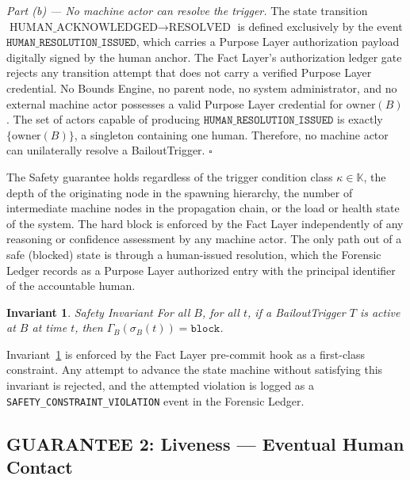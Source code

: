 \documentclass[12pt]{article}
\newtheorem{invariant}{Invariant}
\begin{document}
\medskip

\noindent\textit{Part (b) — No machine actor can resolve the trigger.} The state transition $\text{HUMAN\_ACKNOWLEDGED} \rightarrow \text{RESOLVED}$ is defined exclusively by the event $\texttt{HUMAN\_RESOLUTION\_ISSUED}$, which carries a Purpose Layer authorization payload digitally signed by the human anchor. The Fact Layer's authorization ledger gate rejects any transition attempt that does not carry a verified Purpose Layer credential. No Bounds Engine, no parent node, no system administrator, and no external machine actor possesses a valid Purpose Layer credential for $\text{owner}(B)$. The set of actors capable of producing $\texttt{HUMAN\_RESOLUTION\_ISSUED}$ is exactly $\{\text{owner}(B)\}$, a singleton containing one human. Therefore, no machine actor can unilaterally resolve a BailoutTrigger. $\square$

\bigskip

The Safety guarantee holds regardless of the trigger condition class $\kappa \in \mathbb{K}$, the depth of the originating node in the spawning hierarchy, the number of intermediate machine nodes in the propagation chain, or the load or health state of the system. The hard block is enforced by the Fact Layer independently of any reasoning or confidence assessment by any machine actor. The only path out of a safe (blocked) state is through a human-issued resolution, which the Forensic Ledger records as a Purpose Layer authorized entry with the principal identifier of the accountable human.

\begin{invariant}{Safety Invariant}
\label{inv:safety}
For all $B$, for all $t$, if a BailoutTrigger $T$ is active at $B$ at time $t$, then $\Gamma_B(\sigma_B(t)) = \texttt{block}$.
\end{invariant}

Invariant~\ref{inv:safety} is enforced by the Fact Layer pre-commit hook as a first-class constraint. Any attempt to advance the state machine without satisfying this invariant is rejected, and the attempted violation is logged as a \texttt{SAFETY\_CONSTRAINT\_VIOLATION} event in the Forensic Ledger.

\subsection{GUARANTEE 2: Liveness — Eventual Human Contact}
\label{sec:guarantee-liveness}
\end{document}

